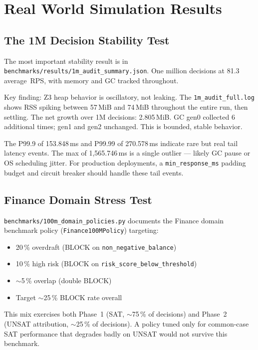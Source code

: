 \documentclass[12pt,a4paper,oneside]{report}
\newcommand{\fname}[1]{\texttt{#1}}          %
\newcommand{\code}[1]{\texttt{#1}}           %
\begin{document}
\chapter{Real World Simulation Results}

\section{The 1M Decision Stability Test}

The most important stability result is in
\fname{benchmarks/results/1m\_audit\_summary.json}. One million decisions at
81.3 average~RPS, with memory and GC tracked throughout.

Key finding: Z3 heap behavior is oscillatory, not leaking. The
\fname{1m\_audit\_full.log} shows RSS spiking between 57\,MiB and 74\,MiB
throughout the entire run, then settling. The net growth over 1M decisions:
2.805\,MiB. GC gen0 collected 6 additional times; gen1 and gen2 unchanged.
This is bounded, stable behavior.

The P99.9 of 153.848\,ms and P99.99 of 270.578\,ms indicate rare but real
tail latency events. The max of 1,565.746\,ms is a single outlier --- likely
GC pause or OS scheduling jitter. For production deployments, a
\code{min\_response\_ms} padding budget and circuit breaker should handle these
tail events.

\section{Finance Domain Stress Test}

\fname{benchmarks/100m\_domain\_policies.py} documents the Finance domain
benchmark policy (\code{Finance100MPolicy}) targeting:
\begin{itemize}
  \item 20\,\% overdraft (BLOCK on \code{non\_negative\_balance})
  \item 10\,\% high risk (BLOCK on \code{risk\_score\_below\_threshold})
  \item $\sim$5\,\% overlap (double BLOCK)
  \item Target $\sim$25\,\% BLOCK rate overall
\end{itemize}

This mix exercises both Phase~1 (SAT, $\sim$75\,\% of decisions) and Phase~2
(UNSAT attribution, $\sim$25\,\% of decisions). A policy tuned only for
common-case SAT performance that degrades badly on UNSAT would not survive
this benchmark.
\end{document}
